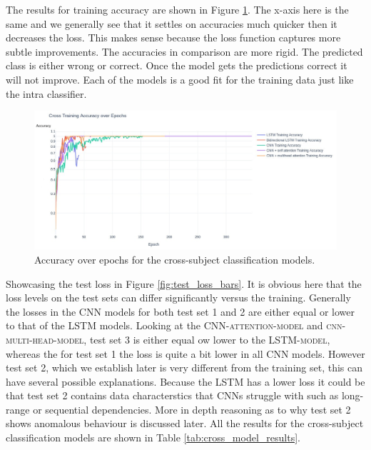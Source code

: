 \documentclass[conference]{IEEEtran}
\begin{document}
The results for training accuracy are shown in Figure \ref{fig:cross_accuracy_over_epoch}. The x-axis here is the same and we generally see that it settles on accuracies much quicker then it decreases the loss. This makes sense because the loss function captures more subtle improvements. The accuracies in comparison are more rigid. The predicted class is either wrong or correct. Once the model gets the predictions correct it will not improve. Each of the models is a good fit for the training data just like the intra classifier.

\begin{figure}[t]
    \centering
    \includegraphics[width=\textwidth]{figures/accuracy graph_over_epochs_small_new.jpg}
    \caption{Accuracy over epochs for the cross-subject classification models.}
    \label{fig:cross_accuracy_over_epoch}
\end{figure}

Showcasing the test loss in Figure \ref{fig:test_loss_bars}. It is obvious here that the loss levels on the test sets can differ significantly versus the training. Generally the losses in the CNN models for both test set 1 and 2 are either equal or lower to that of the LSTM models. Looking at the \textsc{CNN-attention-model} and \textsc{cnn-multi-head-model}, test set 3 is either equal ow lower to the \textsc{LSTM-model}, whereas the for test set 1 the loss is quite a bit lower in all CNN models. However test set 2, which we establish later is very different from the training set, this can have several possible explanations. Because the LSTM has a lower loss it could be that test set 2 contains data characterstics that CNNs struggle with such as long-range or sequential dependencies. More in depth reasoning as to why test set 2 shows anomalous behaviour is discussed later. All the results for the cross-subject classification models are shown in Table \ref{tab:cross_model_results}.
\end{document}
